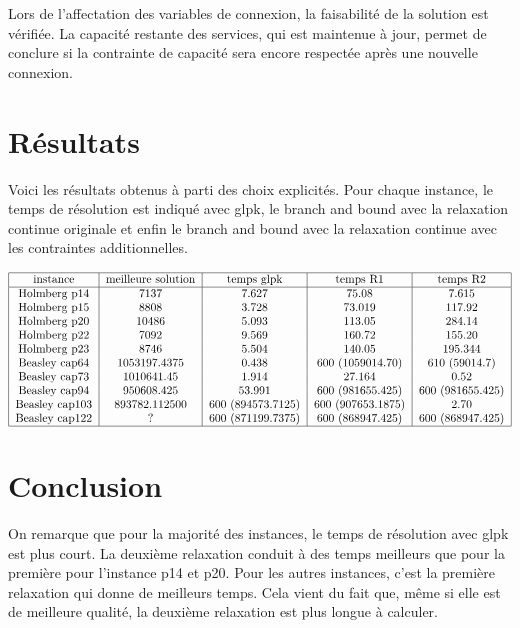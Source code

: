 Lors de l'affectation des variables de connexion, la faisabilité de la solution est vérifiée.
La capacité restante des services, qui est maintenue à jour, permet de conclure si la contrainte de capacité sera encore respectée après une nouvelle connexion.

\section{Résultats}

Voici les résultats obtenus à parti des choix explicités.
Pour chaque instance, le temps de résolution est indiqué avec glpk, le branch and bound avec la relaxation continue originale et enfin le branch and bound avec la relaxation continue avec les contraintes additionnelles.

\begin{align*}
\begin{tabular}{|c|c|c|c|c|}
    \hline
    instance & meilleure solution & temps glpk & temps R1 & temps R2 \\
    \hline
    Holmberg p14 & 7137 & 7.627 & 75.08 & 7.615 \\
    Holmberg p15 & 8808 & 3.728 & 73.019 & 117.92 \\
    Holmberg p20 & 10486 & 5.093 & 113.05 & 284.14 \\
    Holmberg p22 & 7092 & 9.569 & 160.72 & 155.20 \\
    Holmberg p23 & 8746 & 5.504 & 140.05 & 195.344 \\
    Beasley cap64 & 1053197.4375 & 0.438 & 600 (1059014.70) & 610 (59014.7) \\
    Beasley cap73 & 1010641.45 & 1.914 & 27.164 & 0.52 \\
    Beasley cap94 & 950608.425 & 53.991 & 600 (981655.425) & 600 (981655.425) \\
    Beasley cap103 & 893782.112500 & 600 (894573.7125) & 600 (907653.1875) & 2.70 \\
    Beasley cap122 & ? & 600 (871199.7375) & 600 (868947.425) & 600 (868947.425) \\
    \hline
\end{tabular}
\end{align*}

\section{Conclusion}

On remarque que pour la majorité des instances, le temps de résolution avec glpk est plus court.
La deuxième relaxation conduit à des temps meilleurs que pour la première pour l'instance p14 et p20.
Pour les autres instances, c'est la première relaxation qui donne de meilleurs temps. Cela vient du fait que, même si elle est de meilleure qualité, la deuxième relaxation est plus longue à calculer. \newline

